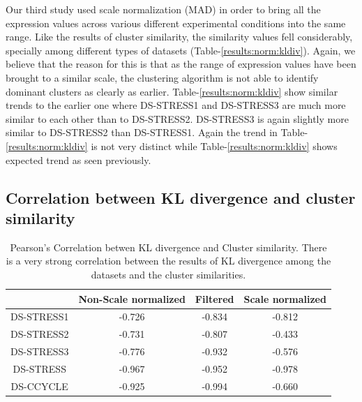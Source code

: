 Our third study used scale normalization (MAD) in order to bring all the expression values across various different experimental conditions into the same range. Like the results of cluster similarity, the similarity values fell considerably, specially among different types of datasets (Table-\ref{results:norm:kldiv}). Again, we believe that the reason for this is that as the range of expression values have been brought to a similar scale, the clustering algorithm is not able to identify dominant clusters as clearly as earlier. Table-\ref{results:norm:kldiv} show similar trends to the earlier one where DS-STRESS1 and DS-STRESS3 are much more similar to each other than to DS-STRESS2. DS-STRESS3 is again slightly more similar to DS-STRESS2 than DS-STRESS1. Again the trend in Table-\ref{results:norm:kldiv} is not very distinct while  Table-\ref{results:norm:kldiv} shows expected trend as seen previously.

\subsection{Correlation between KL divergence and cluster similarity}

\begin{table}[t]
\centering
\begin{tabular}{|c|c|c|c|}
\hline
& Non-Scale normalized & Filtered & Scale normalized \\
\hline

DS-STRESS1 & -0.726	& -0.834  & -0.812 \\ \hline
DS-STRESS2 & -0.731	& -0.807  & -0.433 \\ \hline
DS-STRESS3 & -0.776     & -0.932  & -0.576 \\ \hline
DS-STRESS  & -0.967     & -0.952  & -0.978 \\ \hline
DS-CCYCLE  & -0.925     & -0.994  & -0.660 \\ \hline
\end{tabular}
\caption[Pearson's Correlation betwen KL divergence and Cluster similarity]{Pearson's Correlation betwen KL divergence and Cluster similarity. There is a very strong correlation
between the results of KL divergence among the datasets and the cluster similarities.}
\label{results:correlation_clustering_kldivergence}
\end {table}

